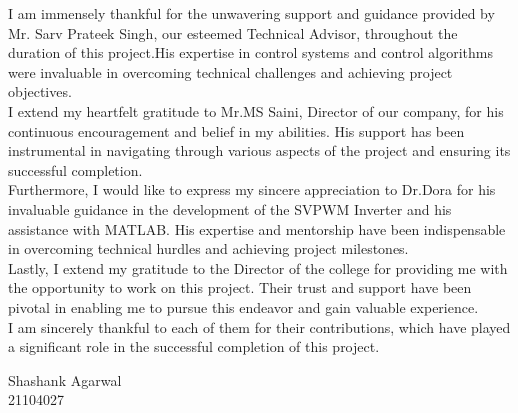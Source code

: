 I am immensely thankful for the unwavering support and guidance provided by Mr.
Sarv Prateek Singh, our esteemed Technical Advisor, throughout the duration of
this project.His expertise in control systems and control algorithms were
invaluable in overcoming technical challenges and achieving project
objectives.\\

I extend my heartfelt gratitude to Mr.MS Saini, Director of our company, for
his continuous encouragement and belief in my abilities. His support has been
instrumental in navigating through various aspects of the project and ensuring
its successful completion.\\

Furthermore, I would like to express my sincere appreciation to Dr.Dora for
his invaluable guidance in the development of the SVPWM Inverter and his
assistance with MATLAB. His expertise and mentorship have been indispensable in
overcoming technical hurdles and achieving project milestones.\\

Lastly, I extend my gratitude to the Director of the college for providing me
with the opportunity to work on this project. Their trust and support have been
pivotal in enabling me to pursue this endeavor and gain valuable experience.\\

I am sincerely thankful to each of them for their contributions, which have
played a significant role in the successful completion of this project.

\vfill
\begin{minipage}[t]{1\textwidth}
    \raggedleft
    Shashank Agarwal\\ 21104027
\end{minipage}